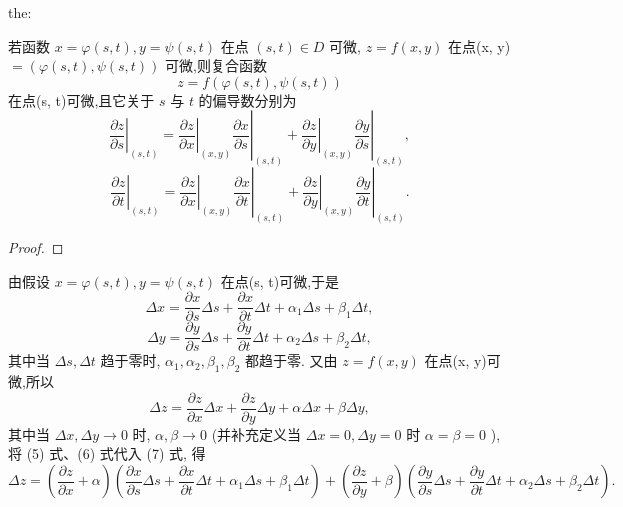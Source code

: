 \begin{theorem}{}{the:}

\end{theorem}
 若函数 \(x = \varphi \left( {s,t}\right) ,y = \psi \left( {s,t}\right)\) 在点 \(\left( {s,t}\right)  \in  D\) 可微, \(z = f\left( {x,y}\right)\) 在点(x, y) \(= \left( {\varphi \left( {s,t}\right) ,\psi \left( {s,t}\right) }\right)\) 可微,则复合函数
\[
z = f\left( {\varphi \left( {s,t}\right) ,\psi \left( {s,t}\right) }\right)
\]
在点(s, t)可微,且它关于 \(s\) 与 \(t\) 的偏导数分别为
\[
{\left. \frac{\partial z}{\partial s}\right| }_{\left( s,t\right) } = {\left. {\left. \frac{\partial z}{\partial x}\right| }_{\left( x,y\right) }\frac{\partial x}{\partial s}\right| }_{\left( s,t\right) } + {\left. {\left. \frac{\partial z}{\partial y}\right| }_{\left( x,y\right) }\frac{\partial y}{\partial s}\right| }_{\left( s,t\right) }, \tag{4}
\]
\[
{\left. \frac{\partial z}{\partial t}\right| }_{\left( s,t\right) } = {\left. {\left. \frac{\partial z}{\partial x}\right| }_{\left( x,y\right) }\frac{\partial x}{\partial t}\right| }_{\left( s,t\right) } + {\left. {\left. \frac{\partial z}{\partial y}\right| }_{\left( x,y\right) }\frac{\partial y}{\partial t}\right| }_{\left( s,t\right) }.
\]
\begin{proof}

\end{proof}
由假设 \(x = \varphi \left( {s,t}\right) ,y = \psi \left( {s,t}\right)\) 在点(s, t)可微,于是
\[
{\Delta x} = \frac{\partial x}{\partial s}{\Delta s} + \frac{\partial x}{\partial t}{\Delta t} + {\alpha }_{1}{\Delta s} + {\beta }_{1}{\Delta t}, \tag{5}
\]
\[
{\Delta y} = \frac{\partial y}{\partial s}{\Delta s} + \frac{\partial y}{\partial t}{\Delta t} + {\alpha }_{2}{\Delta s} + {\beta }_{2}{\Delta t}, \tag{6}
\]
其中当 \({\Delta s},{\Delta t}\) 趋于零时, \({\alpha }_{1},{\alpha }_{2},{\beta }_{1},{\beta }_{2}\) 都趋于零. 又由 \(z = f\left( {x,y}\right)\) 在点(x, y)可微,所以
\[
{\Delta z} = \frac{\partial z}{\partial x}{\Delta x} + \frac{\partial z}{\partial y}{\Delta y} + {\alpha \Delta x} + {\beta \Delta y}, \tag{7}
\]
其中当 \({\Delta x},{\Delta y} \rightarrow  0\) 时, \(\alpha ,\beta  \rightarrow  0\) (并补充定义当 \({\Delta x} = 0,{\Delta y} = 0\) 时 \(\alpha  = \beta  = 0\) ),将 (5) 式、(6) 式代入 (7) 式, 得
\[
{\Delta z} = \left( {\frac{\partial z}{\partial x} + \alpha }\right) \left( {\frac{\partial x}{\partial s}{\Delta s} + \frac{\partial x}{\partial t}{\Delta t} + {\alpha }_{1}{\Delta s} + {\beta }_{1}{\Delta t}}\right)  + \left( {\frac{\partial z}{\partial y} + \beta }\right) \left( {\frac{\partial y}{\partial s}{\Delta s} + \frac{\partial y}{\partial t}{\Delta t} + {\alpha }_{2}{\Delta s} + {\beta }_{2}{\Delta t}}\right) .
\]
